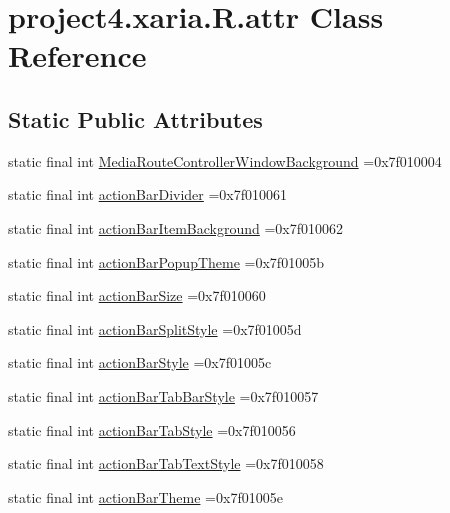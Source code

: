 \hypertarget{classproject4_1_1xaria_1_1R_1_1attr}{}\section{project4.\+xaria.\+R.\+attr Class Reference}
\label{classproject4_1_1xaria_1_1R_1_1attr}
\subsection*{Static Public Attributes}
\begin{DoxyCompactItemize}
\item 
static final int \hyperlink{classproject4_1_1xaria_1_1R_1_1attr_aa4d2aa076a0fb231c478d7dc0ac8136d}{Media\+Route\+Controller\+Window\+Background} =0x7f010004
\item 
static final int \hyperlink{classproject4_1_1xaria_1_1R_1_1attr_a642e151cafea0d435b36d7450aa29724}{action\+Bar\+Divider} =0x7f010061
\item 
static final int \hyperlink{classproject4_1_1xaria_1_1R_1_1attr_a80b5be6125d2b9603b9b70c73528c836}{action\+Bar\+Item\+Background} =0x7f010062
\item 
static final int \hyperlink{classproject4_1_1xaria_1_1R_1_1attr_a278e35181744e7d7ea6c0f1ccfb4ddea}{action\+Bar\+Popup\+Theme} =0x7f01005b
\item 
static final int \hyperlink{classproject4_1_1xaria_1_1R_1_1attr_a43fe3425941b92ca33d6264c94a285a4}{action\+Bar\+Size} =0x7f010060
\item 
static final int \hyperlink{classproject4_1_1xaria_1_1R_1_1attr_a278ac5f613b8353d0cb9ba569d288990}{action\+Bar\+Split\+Style} =0x7f01005d
\item 
static final int \hyperlink{classproject4_1_1xaria_1_1R_1_1attr_a2b8dce34674190bbb904ab8f5002adba}{action\+Bar\+Style} =0x7f01005c
\item 
static final int \hyperlink{classproject4_1_1xaria_1_1R_1_1attr_a037f4555c1943e55aa1d65714df93301}{action\+Bar\+Tab\+Bar\+Style} =0x7f010057
\item 
static final int \hyperlink{classproject4_1_1xaria_1_1R_1_1attr_ae6920fe5addd68c49419ec4e6bfe97dd}{action\+Bar\+Tab\+Style} =0x7f010056
\item 
static final int \hyperlink{classproject4_1_1xaria_1_1R_1_1attr_a67187b7f7a328e711ba8465a8796b86d}{action\+Bar\+Tab\+Text\+Style} =0x7f010058
\item 
static final int \hyperlink{classproject4_1_1xaria_1_1R_1_1attr_a85a3a6317a99fe6e88e7b5eb5e3fb58a}{action\+Bar\+Theme} =0x7f01005e

\end{DoxyCompactItemize}
